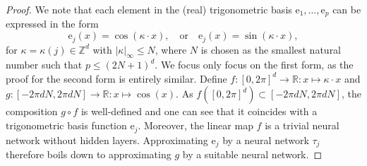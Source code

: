 \documentclass{article}
\numberwithin{equation}{section}
\newcommand{\fb}{\bm{\mathrm{e}}}
\newcommand{\R}{\mathbb{R}}
\newcommand{\Z}{\mathbb{Z}}
\newcommand{\1}{\mathbbm{1}}
\begin{document}
\begin{proof}
We note that each element in the (real) trigonometric basis $\fb_1,\dots, \fb_p$ can be expressed in the form 
\begin{equation}
\fb_j({x}) 
=
\cos(\kappa\cdot {x}),
\quad
\text{or}
\quad
\fb_j({x}) = \sin(\kappa\cdot {x}),
\end{equation}
for $\kappa = \kappa(j)\in \Z^d$ with $|\kappa|_\infty \le N$, where $N$ is chosen as the smallest natural number such that $p \le (2N+1)^d$. We focus only focus on the first form, as the proof for the second form is entirely similar. Define $f:[0,2\pi]^d\to\R:x\mapsto 
\kappa\cdot x$ and $g:[-2\pi dN, 2\pi dN]\to\R:x\mapsto \cos(x)$. As $f([0,2\pi]^d) \subset [-2\pi dN, 2\pi dN]$, the composition $g\circ f$ is well-defined and one can see that it coincides with a trigonometric basis function $\fb_j$. 
Moreover, the linear map $f$ is a trivial neural network without hidden layers. Approximating $\fb_j$ by a neural network $\tau_j$ therefore boils down to approximating $g$ by a suitable neural network. 


\end{proof}
\end{document}
